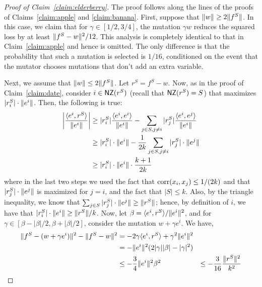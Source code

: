 \begin{proof}[Proof of Claim~\ref{claim:elderberry}] 
The proof follows along the lines of the proofs of Claims~\ref{claim:apple} and
\ref{claim:banana}.  First, suppose that $\Vert w \Vert \geq 2 \Vert f^S \Vert$.
In this case, we claim that for $\gamma \in [1/2, 3/4]$, the mutation $\gamma w$
reduces the squared loss by at least $\Vert f^S - w \Vert^2/12$. This analysis is
completely identical to that in Claim~\ref{claim:apple} and hence is omitted.
The only difference is that the probability that such a mutation is selected is
$1/16$, conditioned on the event that the mutator chooses mutations that don't
add an extra variable.

Next, we assume that $\Vert w \Vert \leq 2 \Vert f^S \Vert$. Let $r^S = f^S - w$.
Now, as in the proof of Claim~\ref{claim:date}, consider $i \in \mathsf{NZ}(r^S)$ (recall
that $\mathsf{NZ}(r^S) = S$) that maximizes $|r^S_i| \cdot \Vert e^i \Vert$.
Then, the following is true:
\begin{align}
\left| \frac{\langle e^i, r^S \rangle}{\Vert e^i \Vert} \right| &\geq |r^S_i|
\frac{\langle e^i, e^i \rangle}{\Vert e^i \Vert} - \sum_{j \in S, j \neq i} |r^S_j|
\frac{\langle e^i, e^j \rangle}{\Vert e^i \Vert} \nonumber \\
&\geq |r^S_i| \cdot \Vert e^i \Vert - \frac{1}{2k} \sum_{j \in S, j \neq i}
|r^S_j| \cdot \Vert e^j \Vert \nonumber \\
&\geq |r^S_i| \cdot \Vert e^i \Vert \cdot \frac{k+1}{2k} \label{eqn:fennel}
\end{align}
%
where in the last two steps we used the fact that $\mathrm{corr}(x_i, x_j) \leq 1/(2k)$
and that $|r^S_j| \cdot \Vert e^j \Vert$ is maximized for $j = i$, and the fact
that $|S| \leq k$. Also, by the triangle inequality, we know that $\sum_{j \in
S} |r^S_j| \cdot \Vert e^j \Vert \geq \Vert r^S \Vert$; hence, by definition of
$i$, we have that $|r^S_i| \cdot \Vert e^i \Vert \geq \Vert r^S \Vert/k$. Now, let
$\beta = \langle e^i, r^S \rangle/\Vert e^i \Vert^2$, and for $\gamma \in [\beta -
|\beta|/2, \beta + |\beta|/2]$, consider the mutation $w + \gamma e^i$. We have,
\begin{align*}
\ltwonorm{f^S - (w + \gamma e^i)}^2 - \ltwonorm{f^S - w}^2 &= -2 \gamma
\ip{e^i}{r^S} + \gamma^2 \ltwonorm{e^i}^2 \\
&= - \ltwonorm{e^i}^2(2 |\gamma| |\beta| - |\gamma|^2) \\
&\leq - \frac{3}{4} \ltwonorm{e^i}^2 \beta^2 %
&\leq - \frac{3}{16} \frac{\ltwonorm{r^S}^2}{k^2} %
\end{align*}


\end{proof}
